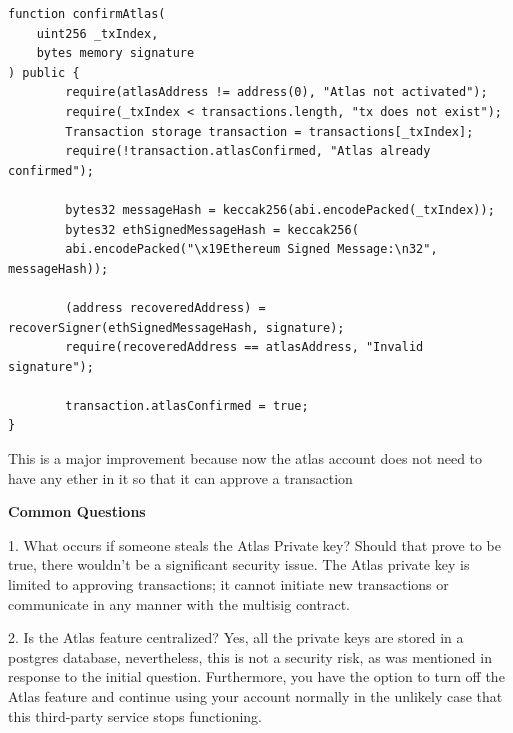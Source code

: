 \begin{verbatim}
function confirmAtlas(
	uint256 _txIndex, 
	bytes memory signature
) public {
		require(atlasAddress != address(0), "Atlas not activated");
		require(_txIndex < transactions.length, "tx does not exist");
		Transaction storage transaction = transactions[_txIndex];
		require(!transaction.atlasConfirmed, "Atlas already confirmed");
			
		bytes32 messageHash = keccak256(abi.encodePacked(_txIndex));
		bytes32 ethSignedMessageHash = keccak256(
		abi.encodePacked("\x19Ethereum Signed Message:\n32", messageHash));
			
		(address recoveredAddress) = recoverSigner(ethSignedMessageHash, signature);
		require(recoveredAddress == atlasAddress, "Invalid signature");
				
		transaction.atlasConfirmed = true;
}
\end{verbatim}
This is a major improvement because now the atlas account does not need to have any ether in it so that it can approve a transaction
\par \textbf{Common Questions}
\par 1. What occurs if someone steals the Atlas Private key? Should that prove to be true, there wouldn't be a significant security issue. The Atlas private key is limited to approving transactions; it cannot initiate new transactions or communicate in any manner with the multisig contract.
\par 2. Is the Atlas feature centralized? Yes, all the private keys are stored in a postgres database, nevertheless, this is not a security risk, as was mentioned in response to the initial question. Furthermore, you have the option to turn off the Atlas feature and continue using your account normally in the unlikely case that this third-party service stops functioning.

